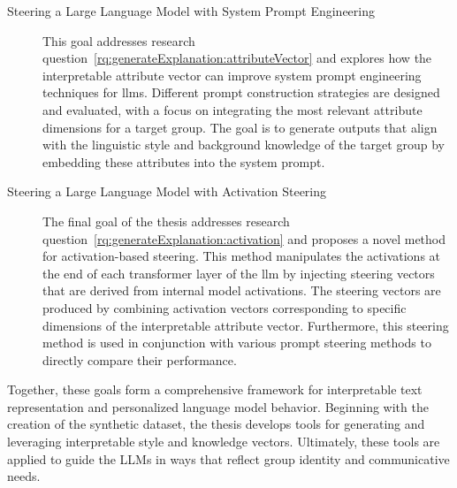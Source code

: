 \begin{description}
      \item[Steering a Large Language Model with System Prompt Engineering]\hspace{\maxstretch}
            This goal addresses research question~\ref{rq:generateExplanation:attributeVector} and explores how the interpretable attribute vector can improve system prompt engineering techniques for \acp{llm}. Different prompt construction strategies are designed and evaluated, with a focus on integrating the most relevant attribute dimensions for a target group. The goal is to generate outputs that align with the linguistic style and background knowledge of the target group by embedding these attributes into the system prompt.

      \item[Steering a Large Language Model with Activation Steering]\hphantom{i}
            The final goal of the thesis addresses research question~\ref{rq:generateExplanation:activation} and proposes a novel method for activation-based steering. This method manipulates the activations at the end of each transformer layer of the \ac{llm} by injecting steering vectors that are derived from internal model activations. The steering vectors are produced by combining activation vectors corresponding to specific dimensions of the interpretable attribute vector. Furthermore, this steering method is used in conjunction with various prompt steering methods to directly compare their performance.
\end{description}

Together, these goals form a comprehensive framework for interpretable text representation and personalized language model behavior. Beginning with the creation of the synthetic dataset, the thesis develops tools for generating and leveraging interpretable style and knowledge vectors. Ultimately, these tools are applied to guide the LLMs in ways that reflect group identity and communicative needs.
